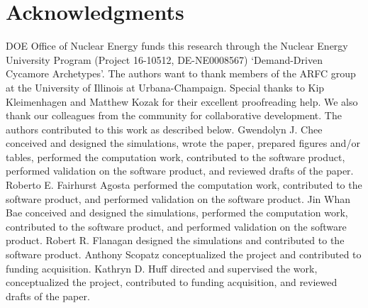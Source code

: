 \section{Acknowledgments}
\gls{DOE} Office of Nuclear Energy funds this research through 
the  Nuclear Energy University Program (Project 16-10512, DE-NE0008567) 
`Demand-Driven Cycamore Archetypes'. The authors want to thank 
members of the \gls{ARFC} group at the University of Illinois at 
Urbana-Champaign. 
Special thanks to Kip Kleimenhagen and Matthew Kozak 
for their excellent proofreading help. 
We also thank our colleagues from the \Cyclus community
for collaborative \Cyclus development.
The authors contributed to this work as described below. 
Gwendolyn J. Chee conceived and designed the simulations, wrote the 
paper, prepared figures and/or tables, performed the computation work, 
contributed to the software product, performed validation on the 
software product, and reviewed drafts of the paper. 
Roberto E. Fairhurst Agosta performed the computation work,  
contributed to the software product, and performed validation on the 
software product.
Jin Whan Bae conceived and designed the simulations, performed the computation 
work, contributed to the software product, and performed validation on the 
software product.
Robert R. Flanagan designed the simulations and contributed to the software 
product.
Anthony Scopatz conceptualized the project and contributed to funding acquisition.
Kathryn D. Huff directed and supervised the work, conceptualized the project, 
contributed to funding acquisition, and reviewed drafts of the paper. 